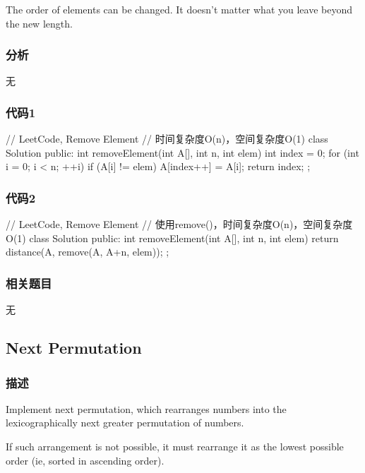 The order of elements can be changed. It doesn't matter what you leave beyond the new length.


\subsubsection{分析}
无


\subsubsection{代码1}
\begin{Code}
// LeetCode, Remove Element
// 时间复杂度O(n)，空间复杂度O(1)
class Solution {
public:
    int removeElement(int A[], int n, int elem) {
        int index = 0;
        for (int i = 0; i < n; ++i) {
            if (A[i] != elem) {
                A[index++] = A[i];
            }
        }
        return index;
    }
};
\end{Code}


\subsubsection{代码2}
\begin{Code}
// LeetCode, Remove Element
// 使用remove()，时间复杂度O(n)，空间复杂度O(1)
class Solution {
public:
    int removeElement(int A[], int n, int elem) {
        return distance(A, remove(A, A+n, elem));
    }
};
\end{Code}


\subsubsection{相关题目}
\begindot
\item 无
\myenddot


\subsection{Next Permutation} %
\label{sec:next-permutation}


\subsubsection{描述}
Implement next permutation, which rearranges numbers into the lexicographically next greater permutation of numbers.

If such arrangement is not possible, it must rearrange it as the lowest possible order (ie, sorted in ascending order).

